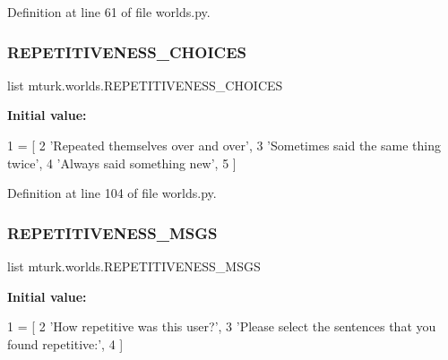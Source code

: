 Definition at line 61 of file worlds.\+py.

\mbox{\label{namespacemturk_1_1worlds_ab33929041c243d9c60ec0697cc9e6344}} 
\subsubsection{\texorpdfstring{R\+E\+P\+E\+T\+I\+T\+I\+V\+E\+N\+E\+S\+S\+\_\+\+C\+H\+O\+I\+C\+ES}{REPETITIVENESS\_CHOICES}}
{\footnotesize\ttfamily list mturk.\+worlds.\+R\+E\+P\+E\+T\+I\+T\+I\+V\+E\+N\+E\+S\+S\+\_\+\+C\+H\+O\+I\+C\+ES}

{\bfseries Initial value\+:}
\begin{DoxyCode}
1 =  [
2     \textcolor{stringliteral}{'Repeated themselves over and over'},
3     \textcolor{stringliteral}{'Sometimes said the same thing twice'},
4     \textcolor{stringliteral}{'Always said something new'},
5 ]
\end{DoxyCode}


Definition at line 104 of file worlds.\+py.

\mbox{\label{namespacemturk_1_1worlds_adb2c239df3437b1df085f4ec2a35a041}} 
\subsubsection{\texorpdfstring{R\+E\+P\+E\+T\+I\+T\+I\+V\+E\+N\+E\+S\+S\+\_\+\+M\+S\+GS}{REPETITIVENESS\_MSGS}}
{\footnotesize\ttfamily list mturk.\+worlds.\+R\+E\+P\+E\+T\+I\+T\+I\+V\+E\+N\+E\+S\+S\+\_\+\+M\+S\+GS}

{\bfseries Initial value\+:}
\begin{DoxyCode}
1 =  [
2     \textcolor{stringliteral}{'How repetitive was this user?'},
3     \textcolor{stringliteral}{'Please select the sentences that you found repetitive:'},
4 ]
\end{DoxyCode}


